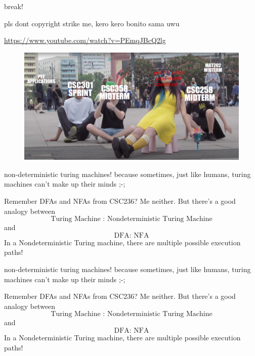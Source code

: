 \documentclass{beamer}
\begin{document}
\begin{frame}{break!}

pls dont copyright strike me, kero kero bonito sama uwu

\url{https://www.youtube.com/watch?v=PEmqJBcQ2lg}

\begin{figure}[h]
\centering
\includegraphics[width=12cm]{img/ao.png}
\end{figure}
\end{frame}

\begin{frame}{non-deterministic turing machines!}
because sometimes, just like humans, turing machines can't make up their minds ;-;

\vspace{2mm}

Remember DFAs and NFAs from CSC236? Me neither. But there's a good analogy between $$\text{Turing Machine : Nondeterministic Turing Machine}$$
and
$$\text{DFA: NFA}$$
In a Nondeterministic Turing machine, there are multiple possible execution paths!
\end{frame}

\begin{frame}{non-deterministic turing machines!}
because sometimes, just like humans, turing machines can't make up their minds ;-;

\vspace{2mm}

Remember DFAs and NFAs from CSC236? Me neither. But there's a good analogy between $$\text{Turing Machine : Nondeterministic Turing Machine}$$
and
$$\text{DFA: NFA}$$
In a Nondeterministic Turing machine, there are multiple possible execution paths!
\end{frame}
\end{document}

